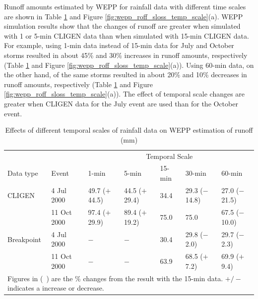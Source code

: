 Runoff amounts estimated by WEPP for rainfall data with different time scales
are shown in Table
\ref{tab:DifferentTemporalScalesOfRainfallDataOnWEPPRunoffEstimation} and Figure
\ref{fig:wepp_roff_sloss_temp_scale}(a). WEPP simulation results show that the
changes of runoff are greater when simulated with 1 or 5-min CLIGEN data than
when simulated with 15-min CLIGEN data. For example, using 1-min data instead of
15-min data for July and October storms resulted in about 45\% and 30\%
increases in runoff amounts, respectively (Table
\ref{tab:DifferentTemporalScalesOfRainfallDataOnWEPPRunoffEstimation} and
Figure \ref{fig:wepp_roff_sloss_temp_scale}(a)). Using 60-min data, on the
other hand, of the same storms resulted in about 20\% and 10\% decreases in
runoff amounts, respectively (Table
\ref{tab:DifferentTemporalScalesOfRainfallDataOnWEPPRunoffEstimation} and
Figure \ref{fig:wepp_roff_sloss_temp_scale}(a)). The effect of temporal scale
changes are greater when CLIGEN data for the July event are used than for the
October event.

\begin{table}[htbp]
  \centering
  \footnotesize
  \caption[Effects of different temporal scales of rainfall data on WEPP
estimation of runoff]{Effects of different temporal scales of rainfall data on
WEPP estimation of runoff (mm)}
  \label{tab:DifferentTemporalScalesOfRainfallDataOnWEPPRunoffEstimation}
    \begin{tabular}{lllllll}
      \toprule
      & & \multicolumn{5}{c}{Temporal Scale}\\
      \cmidrule{3-7}
      Data type & Event & 1-min & 5-min & 15-min & 30-min & 60-min \\
      \midrule
      CLIGEN & 4 Jul 2000 & 49.7 ($+$44.5) & 44.5 ($+$29.4) & 34.4 & 29.3
($-$14.8) & 27.0 ($-$21.5) \\
       & 11 Oct 2000 & 97.4 ($+$29.9) & 89.4 ($+$19.2) & 75.0 & 75.0 & 67.5
($-$10.0) \\
       \midrule
      Breakpoint & 4 Jul 2000 & $-$ & $-$ & 30.4 & 29.8 ($-$2.0) & 29.7
($-$2.3)\\
       & 11 Oct 2000 & $-$ & $-$ & 63.9 & 68.5 ($+$7.2) & 69.9 ($+$9.4)\\
      \bottomrule
      \multicolumn{7}{p{12cm}}{\footnotesize Figures in (\ ) are the \% changes
from the result with the 15-min data. $+/-$ indicates a increase or decrease.}\\
    \end{tabular}
\end{table}

